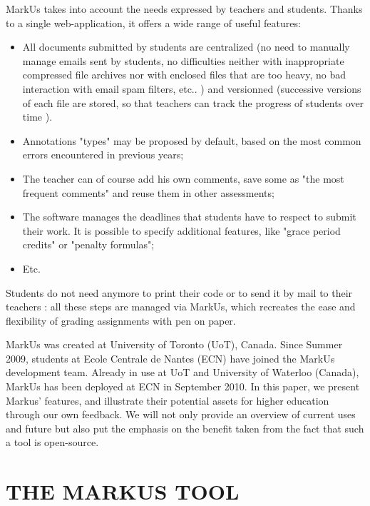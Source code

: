 \documentclass[twocolumn,10pt]{asme2e}
\begin{document}
MarkUs takes into account the needs expressed by teachers and students. Thanks to a single web-application, it offers a wide range of useful features: 
\begin{itemize}
\item All documents submitted by students are centralized (no need to manually manage emails sent by students, no difficulties neither with inappropriate compressed file archives nor with enclosed files that are too heavy, no bad interaction with email spam filters, etc.. ) and versionned (successive versions of each file are stored, so that teachers can track the progress of students over time \cite{Reid05learningby}).
\item Annotations "types" may be proposed by default, based on the most common errors encountered in previous years;
\item The teacher can of course add his own comments, save some as "the most frequent comments" and reuse them in other assessments; 
\item The software manages the deadlines that students have to respect to submit their work. It is possible to specify additional features, like "grace period credits" or "penalty formulas";
\item Etc.
\end{itemize}

Students do not need anymore to print their code or to send it by mail to their teachers : all these steps are managed via MarkUs, which recreates the ease and flexibility of grading assignments with pen on paper. 

MarkUs was created at University of Toronto (UoT), Canada. Since Summer 2009, students at Ecole Centrale de Nantes (ECN) have joined the MarkUs development team. Already in use at UoT and University of Waterloo (Canada), MarkUs has been deployed at ECN in September 2010. In this paper, we present Markus' features, and illustrate their potential assets for higher education through our own feedback. We will not only provide an overview of current uses and future but also put the emphasis on the benefit taken from the fact that such a tool is open-source. 



\section*{THE MARKUS TOOL}

\end{document}
